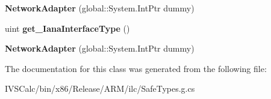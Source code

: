 \begin{DoxyCompactItemize}
\item 
\mbox{\label{class_windows_1_1_networking_1_1_connectivity_1_1_network_adapter_ac4fc565dd5b3ac79f763232390609604}} 
{\bfseries Network\+Adapter} (global\+::\+System.\+Int\+Ptr dummy)
\item 
\mbox{\label{class_windows_1_1_networking_1_1_connectivity_1_1_network_adapter_a3fc132979b196005fcae9d8f1e88c0df}} 
uint {\bfseries get\+\_\+\+Iana\+Interface\+Type} ()
\item 
\mbox{\label{class_windows_1_1_networking_1_1_connectivity_1_1_network_adapter_ac4fc565dd5b3ac79f763232390609604}} 
{\bfseries Network\+Adapter} (global\+::\+System.\+Int\+Ptr dummy)
\end{DoxyCompactItemize}


The documentation for this class was generated from the following file\+:\begin{DoxyCompactItemize}
\item 
I\+V\+S\+Calc/bin/x86/\+Release/\+A\+R\+M/ilc/Safe\+Types.\+g.\+cs\end{DoxyCompactItemize}
